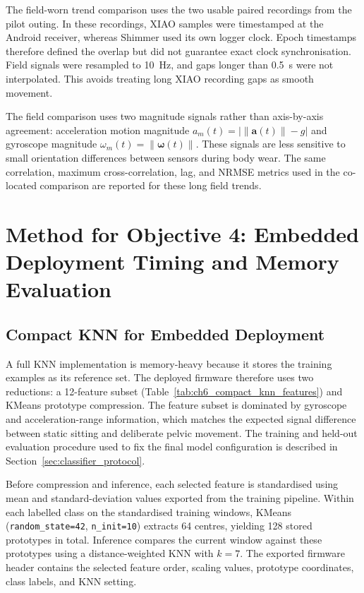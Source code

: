 The field-worn trend comparison uses the two usable paired recordings from the pilot outing. In these recordings, XIAO samples were timestamped at the Android receiver, whereas Shimmer used its own logger clock. Epoch timestamps therefore defined the overlap but did not guarantee exact clock synchronisation. Field signals were resampled to 10~Hz, and gaps longer than 0.5~s were not interpolated. This avoids treating long XIAO recording gaps as smooth movement.

The field comparison uses two magnitude signals rather than axis-by-axis agreement: acceleration motion magnitude \(a_m(t)=\left|\lVert\mathbf{a}(t)\rVert-g\right|\) and gyroscope magnitude \(\omega_m(t)=\lVert\boldsymbol{\omega}(t)\rVert\). These signals are less sensitive to small orientation differences between sensors during body wear. The same correlation, maximum cross-correlation, lag, and NRMSE metrics used in the co-located comparison are reported for these long field trends.

\FloatBarrier

\section{Method for Objective 4: Embedded Deployment Timing and Memory Evaluation}\label{sec:compact_timing_protocol}

\subsection{Compact KNN for Embedded Deployment}\label{sec:compact_knn}

A full KNN implementation is memory-heavy because it stores the training examples as its reference set. The deployed firmware therefore uses two reductions: a 12-feature subset (Table~\ref{tab:ch6_compact_knn_features}) and KMeans prototype compression. The feature subset is dominated by gyroscope and acceleration-range information, which matches the expected signal difference between static sitting and deliberate pelvic movement. The training and held-out evaluation procedure used to fix the final model configuration is described in Section~\ref{sec:classifier_protocol}.

Before compression and inference, each selected feature is standardised using mean and standard-deviation values exported from the training pipeline. Within each labelled class on the standardised training windows, KMeans (\texttt{random\_state=42}, \texttt{n\_init=10}) extracts 64 centres, yielding 128 stored prototypes in total. Inference compares the current window against these prototypes using a distance-weighted KNN with \(k=7\). The exported firmware header contains the selected feature order, scaling values, prototype coordinates, class labels, and KNN setting.

